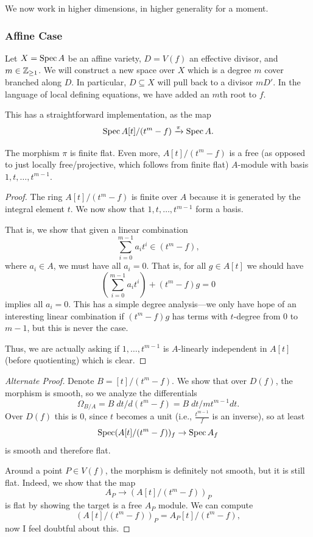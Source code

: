\documentclass[12pt]{article}
\begin{document}
We now work in higher dimensions, in higher generality for a moment.

\subsubsection{Affine Case}

Let $X=\operatorname{Spec} A$ be an affine variety, $D=V(f)$ an effective divisor, and $m\in \mathbb{Z}_{\geq 1}$. We will construct a new space over $X$ which is a degree $m$ cover branched along $D$. In particular, $D\subseteq X$ will pull back to a divisor $mD'$. In the language of local defining equations, we have added an $m$th root to $f$.

This has a straightforward implementation, as the map
\[\operatorname{Spec} A[t]/(t^m - f) \xrightarrow{\pi} \operatorname{Spec} A.\]

\begin{prop}
    The morphism $\pi$ is finite flat. Even more, $A[t]/(t^m - f)$ is a free (as opposed to just locally free/projective, which follows from finite flat) $A$-module with basis $1,t,\dots,t^{m-1}$.
\end{prop}

\begin{proof}
    The ring $A[t]/(t^m -f)$ is finite over $A$ because it is generated by the integral element $t$. We now show that $1,t,\dots,t^{m-1}$ form a basis.

    That is, we show that given a linear combination
    \[\sum_{i=0}^{m-1} a_i t^i \in (t^m - f),\]
    where $a_i\in A$, we must have all $a_i=0$. That is, for all $g\in A[t]$ we should have
    \[\left(\sum_{i=0}^{m-1} a_i t^i\right) + (t^m -f)g =0\]
    implies all $a_i=0$. This has a simple degree analysis---we only have hope of an interesting linear combination if $(t^m - f)g$ has terms with $t$-degree from $0$ to $m-1$, but this is never the case.

    Thus, we are actually asking if $1,\dots,t^{m-1}$ is $A$-linearly independent in $A[t]$ (before quotienting) which is clear.
\end{proof}

\begin{proof}[Alternate Proof]
    Denote $B=[t]/(t^m-f)$. We show that over $D(f)$, the morphism is smooth, so we analyze the differentials
    \[\Omega_{B/A} = B\;dt/d(t^m-f) = B\;dt/ mt^{m-1}dt.\]
    Over $D(f)$ this is 0, since $t$ becomes a unit (i.e., $\frac{t^{m-1}}{f}$ is an inverse), so at least
    \[\operatorname{Spec} (A[t]/(t^m-f))_f \to \operatorname{Spec} A_f\]
    is smooth and therefore flat.
    
    Around a point $P\in V(f)$, the morphism is definitely not smooth, but it is still flat. Indeed, we show that the map
    \[A_P\to (A[t]/(t^m-f))_P\]
    is flat by showing the target is a free $A_P$ module. We can compute
    \[(A[t]/(t^m-f))_P = A_P[t]/(t^m-f),\]
    {\color{red} now I feel doubtful about this.}
\end{proof}
\end{document}
